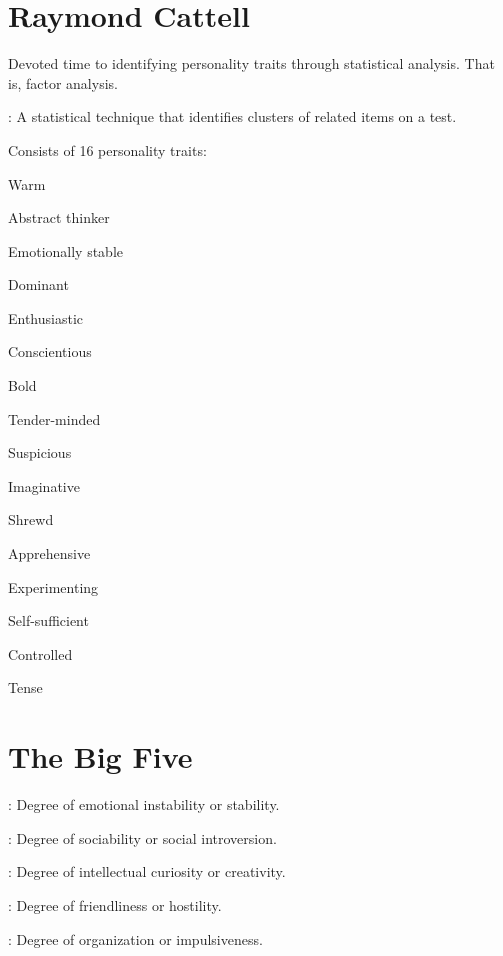 \section{Raymond Cattell}

\begin{coloredlist}
    \item Devoted time to identifying personality traits through statistical analysis. That is, factor analysis.
    \item {}: A statistical technique that identifies clusters of related items on a test.
    \item Consists of 16 personality traits:
    \begin{enumerate}
        \begin{multicols}{2}
            \item Warm
            \item Abstract thinker
            \item Emotionally stable
            \item Dominant
            \item Enthusiastic
            \item Conscientious
            \item Bold
            \item Tender-minded
            \item Suspicious
            \item Imaginative
            \item Shrewd
            \item Apprehensive
            \item Experimenting
            \item Self-sufficient
            \item Controlled
            \item Tense
        \end{multicols}
    \end{enumerate}
\end{coloredlist}

\section{The Big Five}

\begin{coloredlist}
    \item {}: Degree of emotional instability or stability.
    \item {}: Degree of sociability or social introversion.
    \item {}: Degree of intellectual curiosity or creativity.
    \item {}: Degree of friendliness or hostility.
    \item {}: Degree of organization or impulsiveness.
\end{coloredlist}

